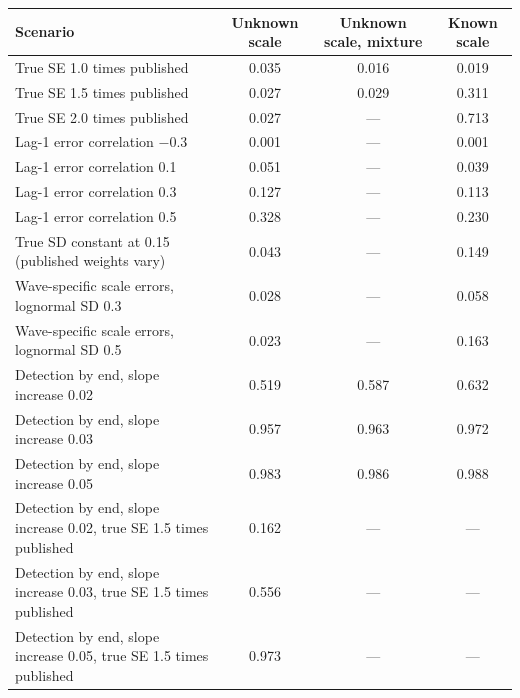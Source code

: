 \begin{tabular}{lccc}
\toprule
Scenario & Unknown scale & Unknown scale, mixture & Known scale \\
\midrule
True SE 1.0 times published & 0.035 & 0.016 & 0.019 \\
True SE 1.5 times published & 0.027 & 0.029 & 0.311 \\
True SE 2.0 times published & 0.027 & --- & 0.713 \\
\midrule
Lag-1 error correlation $-0.3$ & 0.001 & --- & 0.001 \\
Lag-1 error correlation 0.1 & 0.051 & --- & 0.039 \\
Lag-1 error correlation 0.3 & 0.127 & --- & 0.113 \\
Lag-1 error correlation 0.5 & 0.328 & --- & 0.230 \\
True SD constant at 0.15 (published weights vary) & 0.043 & --- & 0.149 \\
Wave-specific scale errors, lognormal SD 0.3 & 0.028 & --- & 0.058 \\
Wave-specific scale errors, lognormal SD 0.5 & 0.023 & --- & 0.163 \\
\midrule
Detection by end, slope increase 0.02 & 0.519 & 0.587 & 0.632 \\
Detection by end, slope increase 0.03 & 0.957 & 0.963 & 0.972 \\
Detection by end, slope increase 0.05 & 0.983 & 0.986 & 0.988 \\
Detection by end, slope increase 0.02, true SE 1.5 times published & 0.162 & --- & --- \\
Detection by end, slope increase 0.03, true SE 1.5 times published & 0.556 & --- & --- \\
Detection by end, slope increase 0.05, true SE 1.5 times published & 0.973 & --- & --- \\
\bottomrule
\end{tabular}
